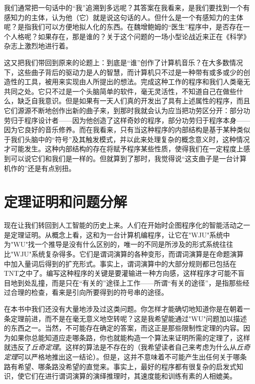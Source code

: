 我们通常把一句话中的“我”追溯到多远呢？其答案在我看来，是我们要找到一个有感知力的主体，认为他（它）就是说这句话的人。但什么是一个有感知力的主体呢？是指我们可以方便地拟人化的东西。在魏增鲍姆的“医生”程序中，是否存在一个人格呢？如果存在，那是谁的？关于这个问题的一场小型论战近来正在《科学》杂志上激烈地进行着。

这又把我们带回到原来的论题上：到底是“谁”创作了计算机音乐？在大多数情况下，这些曲子背后的驱动力是人的智慧，而计算机只不过是一种带有或多或少的创造性的工具，被用来实现由人所提出的想法。完成这种工作的程序和我们人类毫无共同之处。它只不过是一个头脑简单的软件，毫无灵活性，不知道自己在做些什么，缺乏自我意识。但是如果有一天人们真的开发出了具有上述属性的程序，而且它们源源不断地创作出新的曲子来，到那时我就会认为应当把功劳区分开：部分功劳归于程序设计者——因为他创造了这样奇妙的程序，部分功劳归于程序本身——因为它良好的音乐修养。而在我看来，只有当这种程序的内部结构是基于某种类似于我们头脑中的“符号”及其触发模式，并以此来处理复杂的概念意义时，这种情况才可能发生。这种内部结构的存在将赋予程序某些性质，使得我们在一定程度上感到可以说它们和我们是一样的。但就算到了那时，我觉得说“这支曲子是一台计算机作的”还是有点别扭。

\section{定理证明和问题分解}

现在让我们转回到人工智能的历史上来。人们在开始时企图程序化的智能活动之一是定理证明。从概念上看，这和为一台计算机编程序，让它在"WJU"系统中为"WU"找一个推导是没有什么区别的，唯一的不同是所涉及的形式系统往往比"WJU"系统复杂得多。它们是谓词演算的各种变形，而谓词演算是在命题演算中加入量词后得到的扩充形式。事实上，谓词演算中的大部分规则都已包括在TNT之中了。编写这种程序的关键是要灌输进一种方向感，这样程序才可能不盲目地到处乱撞，而是只在“有关的”途径上工作——所谓“有关的途径”，是指那些经过合理的检查，看来是引向所要得到的符号串的途径。

在本书中我们还没有大量地涉及过这类问题。你怎样才能确切地知道你是在朝着一条定理前进，而不是在毫无意义地空转呢？这是我希望能通过"WU"问题加以描述的东西之一。当然，不可能存在确定的答案，而这正是那些限制性定理的内容。因为如果你总能知道应走哪条路，你也就能构造一个算法来证明所需的定理了，这样就违反了\emph{丘奇定理}。这样的算法是不存在的（我希望读者自己来考虑为什么从\emph{丘奇定理}可以严格地推出这一结论）。但是，这并不意味着不可能产生出任何关于哪条路有希望、哪条路没希望的直觉来。事实上，最好的程序都有很复杂的启发式知识，使它们在进行谓词演算的演绎推理时，其速度能和训练有素的人相媲美。

